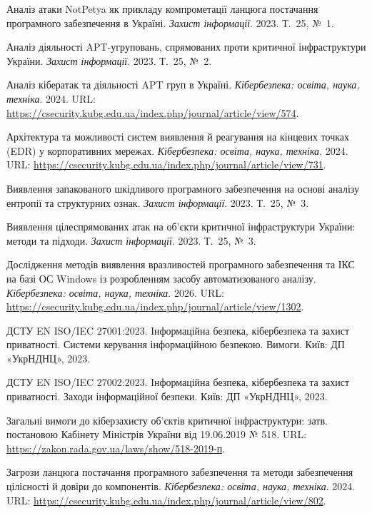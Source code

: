 
 Аналіз атаки NotPetya як прикладу компрометації ланцюга постачання програмного забезпечення в Україні. \emph{Захист інформації}. 2023. Т.~25, №~1.

 Аналіз діяльності APT-угруповань, спрямованих проти критичної інфраструктури України. \emph{Захист інформації}. 2023. Т.~25, №~2.

 Аналіз кібератак та діяльності APT груп в Україні. \emph{Кібербезпека: освіта, наука, техніка}. 2024. URL: \url{https://csecurity.kubg.edu.ua/index.php/journal/article/view/574}.

 Архітектура та можливості систем виявлення й реагування на кінцевих точках (EDR) у корпоративних мережах. \emph{Кібербезпека: освіта, наука, техніка}. 2024. URL: \url{https://csecurity.kubg.edu.ua/index.php/journal/article/view/731}.

 Виявлення запакованого шкідливого програмного забезпечення на основі аналізу ентропії та структурних ознак. \emph{Захист інформації}. 2023. Т.~25, №~3.

 Виявлення цілеспрямованих атак на об'єкти критичної інфраструктури України: методи та підходи. \emph{Захист інформації}. 2023. Т.~25, №~3.

 Дослідження методів виявлення вразливостей програмного забезпечення та ІКС на базі ОС Windows із розробленням засобу автоматизованого аналізу. \emph{Кібербезпека: освіта, наука, техніка}. 2026. URL: \url{https://csecurity.kubg.edu.ua/index.php/journal/article/view/1302}.

 ДСТУ EN ISO/IEC 27001:2023. Інформаційна безпека, кібербезпека та захист приватності. Системи керування інформаційною безпекою. Вимоги. Київ: ДП «УкрНДНЦ», 2023.

 ДСТУ EN ISO/IEC 27002:2023. Інформаційна безпека, кібербезпека та захист приватності. Заходи інформаційної безпеки. Київ: ДП «УкрНДНЦ», 2023.

 Загальні вимоги до кіберзахисту об'єктів критичної інфраструктури: затв. постановою Кабінету Міністрів України від 19.06.2019 № 518. URL: \url{https://zakon.rada.gov.ua/laws/show/518-2019-п}.

 Загрози ланцюга постачання програмного забезпечення та методи забезпечення цілісності й довіри до компонентів. \emph{Кібербезпека: освіта, наука, техніка}. 2024. URL: \url{https://csecurity.kubg.edu.ua/index.php/journal/article/view/802}.

